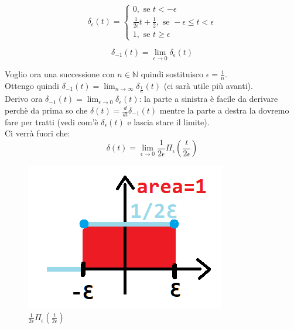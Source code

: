 	\begin{equation*}
	\delta_{ \epsilon}(t)=
	\begin{cases} 
	0, \mbox{ se } t < - \epsilon \\ 
	\frac{1}{2 \epsilon}t + \frac{1}{2}, \mbox{ se } - \epsilon \leq t < \epsilon\\
	1, \mbox{ se } t \geq \epsilon
	\end{cases} 
	\end{equation*}
	
	\begin{equation*}
	\delta_{-1}(t)= \lim_{ \epsilon \to 0} \delta_{\epsilon}(t)
	\end{equation*}

	Voglio ora una successione con $ n \in \mathbb{N} $ quindi sostituisco $ \epsilon = \frac{1}{n}$.\\
	Ottengo quindi $ \delta_{-1}(t)= \lim_{ n \to \infty} \delta_{\frac{1}{n}}(t) $ (ci sarà utile più avanti).\\
	
	Derivo ora $\delta_{-1}(t)= \lim_{ \epsilon \to 0} \delta_{\epsilon}(t) $: la parte a sinistra è facile da derivare perchè da prima so che $ \delta (t) = \frac{d}{dt} \delta_{-1}(t) $ mentre la parte a destra la dovremo fare per tratti (vedi com'è $ \delta_{\epsilon}(t) $ e lascia stare il limite).\\
	Ci verrà fuori che:
	\begin{equation*}
	\delta(t)= \lim_{ \epsilon \to 0} \frac{1}{2 \epsilon}  \varPi_{\epsilon}(\frac{t}{2 \epsilon})
	\end{equation*}
	
	\begin{figure}[h]
		\centering
		\includegraphics[scale=0.5]{immagini/rettangoloEpsilon}
		\caption{ $ \frac{1}{2 \epsilon}  \varPi_{\epsilon}(\frac{t}{2 \epsilon}) $ }
		\label{fig: rettangoloEpsilon}
	\end{figure}

